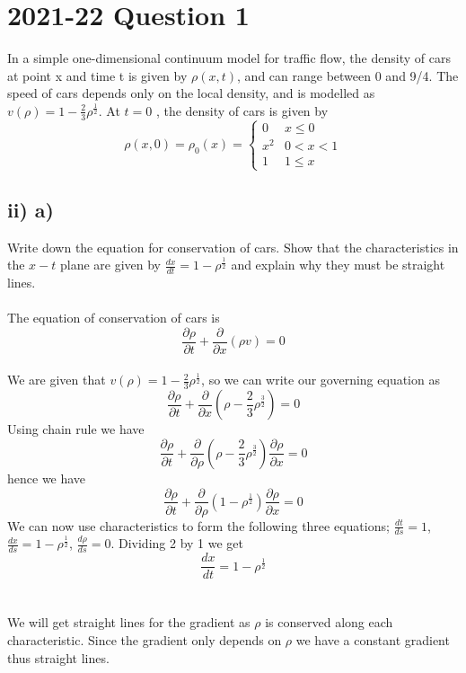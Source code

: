 \documentclass[1pt]{article}
\begin{document}
\section{2021-22 Question 1}

In a simple one-dimensional continuum model for traffic flow, the density
of cars at point x and time t is given by $\rho(x, t)$, and can range between
0 and 9/4. The speed of cars depends only on the local density, and is
modelled as $v(\rho) = 1 - \frac{2}{3}\rho^{\frac{1}{2}}$. At $t = 0$ , the density of cars is given by
$$\rho(x, 0) = \rho_0(x) = \begin{cases}
0 & x\leq 0 \\
x^2 & 0<x<1 \\ 
1 & 1\leq x
\end{cases}$$
\subsection{ii) a)}
Write down the equation for conservation of cars. Show that the
characteristics in the $x-t$ plane are given by $\frac{dx}{dt}=1-\rho^{\frac{1}{2}}$ and explain why they must be straight lines.
\\
\\ The equation of conservation of cars is $$\frac{\partial \rho}{\partial t}+\frac{\partial}{\partial x}(\rho v)=0$$
\\ We are given that $v(\rho)=1-\frac{2}{3}\rho^{\frac{1}{2}}$, so we can write our governing equation as $$\frac{\partial \rho}{\partial t}+\frac{\partial}{\partial x}(\rho-\frac{2}{3}\rho^{\frac{3}{2}})=0$$ Using chain rule we have $$\frac{\partial \rho}{\partial t}+\frac{\partial}{\partial \rho}(\rho-\frac{2}{3}\rho^{\frac{3}{2}})\frac{\partial \rho}{\partial x}=0$$ hence we have $$\frac{\partial \rho}{\partial t}+\frac{\partial}{\partial \rho}(1-\rho^{\frac{1}{2}})\frac{\partial \rho}{\partial x}=0$$ We can now use characteristics to form the following three equations; $\frac{dt}{ds}=1$, $\frac{dx}{ds}=1-\rho^{\frac{1}{2}}$, $\frac{d\rho}{ds}=0$. Dividing 2 by 1 we get $$\frac{dx}{dt}=1-\rho^{\frac{1}{2}}$$
\\
\\ We will get straight lines for the gradient as $\rho$ is conserved along each characteristic. Since the gradient only depends on $\rho$ we have a constant gradient thus straight lines.
\end{document}
